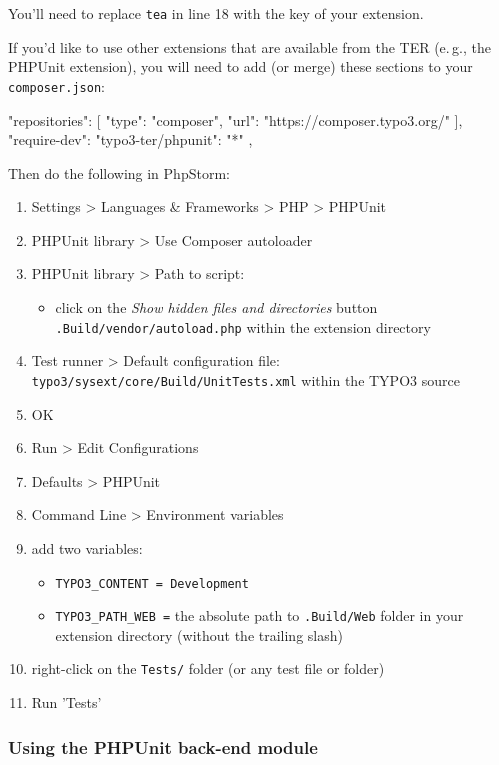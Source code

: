 \documentclass[a4paper,11pt,headsepline]{scrartcl}
\begin{document}
You'll need to replace \texttt{tea} in line 18 with the key of your extension.

If you'd like to use other extensions that are available from the TER (e.\,g., the PHPUnit extension), you will need to add (or merge) these sections to your \texttt{composer.json}:

\begin{jsoncode}
"repositories": [
{
  "type": "composer",
  "url": "https://composer.typo3.org/"
}
],
"require-dev": {
  "typo3-ter/phpunit": "*"
},
\end{jsoncode}

Then do the following in PhpStorm:
\begin{enumerate}
  \item Settings > Languages \& Frameworks > PHP > PHPUnit
  \item PHPUnit library > Use Composer autoloader
  \item PHPUnit library > Path to script:
    \begin{itemize}
      \item click on the \emph{Show hidden files and directories} button
      \texttt{.Build/vendor/autoload.php} within the extension directory
    \end{itemize}
  \item Test runner > Default configuration file: \texttt{typo3/sysext/core/Build/UnitTests.xml} within the TYPO3 source
  \item OK
  \item Run > Edit Configurations
  \item Defaults > PHPUnit
  \item Command Line > Environment variables
  \item add two variables:
    \begin{itemize}
      \item \texttt{TYPO3\_CONTENT = Development}
      \item \texttt{TYPO3\_PATH\_WEB =} the absolute path to \texttt{.Build/Web} folder in your extension directory (without the trailing slash)
    \end{itemize}
  \item right-click on the \texttt{Tests/} folder (or any test file or folder)
  \item Run 'Tests'
\end{enumerate}



\subsubsection{Using the PHPUnit back-end module}
\end{document}
